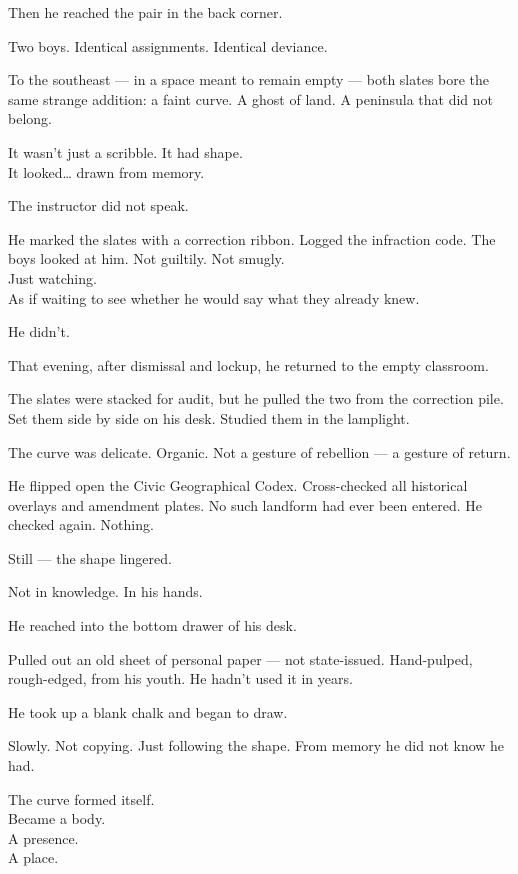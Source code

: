 \documentclass[9pt]{article}
\begin{document}
Then he reached the pair in the back corner.

Two boys. Identical assignments. Identical deviance.

To the southeast --- in a space meant to remain empty --- both slates bore the same strange addition: a faint curve. A ghost of land. A peninsula that did not belong.

It wasn’t just a scribble. It had shape.\\
It looked… drawn from memory.

\vspace{1em}

The instructor did not speak.

He marked the slates with a correction ribbon. Logged the infraction code. The boys looked at him. Not guiltily. Not smugly.\\
Just watching.\\
As if waiting to see whether he would say what they already knew.

He didn’t.

\vspace{1em}

That evening, after dismissal and lockup, he returned to the empty classroom.

The slates were stacked for audit, but he pulled the two from the correction pile. Set them side by side on his desk. Studied them in the lamplight.

The curve was delicate. Organic. Not a gesture of rebellion --- a gesture of return.

He flipped open the Civic Geographical Codex. Cross-checked all historical overlays and amendment plates. No such landform had ever been entered. He checked again. Nothing.

Still --- the shape lingered.

Not in knowledge. In his hands.

\vspace{1em}

He reached into the bottom drawer of his desk.

Pulled out an old sheet of personal paper --- not state-issued. Hand-pulped, rough-edged, from his youth. He hadn’t used it in years.

He took up a blank chalk and began to draw.

Slowly. Not copying. Just following the shape. From memory he did not know he had.

The curve formed itself.\\
Became a body.\\
A presence.\\
A place.
\end{document}
